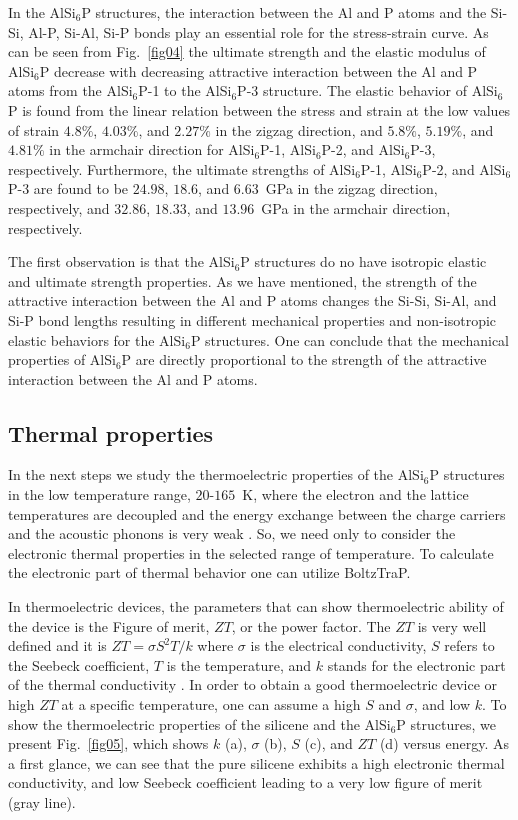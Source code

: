\documentclass[5p,twocolumn]{elsarticle}
\def\fig#1{Fig.\ \ref{#1}}
\begin{document}
In the AlSi$_6$P structures, the interaction between the Al and P atoms and the Si-Si, Al-P, Si-Al, Si-P bonds play an essential role for the stress-strain curve. As can be seen from \fig{fig04} the 
ultimate strength and the elastic modulus of AlSi$_6$P decrease with decreasing attractive interaction between the Al and P atoms from the AlSi$_6$P-1 to the AlSi$_6$P-3 structure. 
The elastic behavior of AlSi$_6$P is found from
the linear relation between the stress and strain at the low values of strain $4.8\%$, $4.03\%$, and $2.27\%$ in the zigzag direction, and $5.8\%$, $5.19\%$, and $4.81\%$ in the armchair direction for 
AlSi$_6$P-1, AlSi$_6$P-2, and AlSi$_6$P-3, respectively.
%
Furthermore, the ultimate strengths of AlSi$_6$P-1, AlSi$_6$P-2, and AlSi$_6$P-3 are found to be $24.98$, $18.6$, and $6.63$~GPa in the zigzag direction, respectively, and $32.86$, $18.33$, and $13.96$~GPa in the armchair direction, respectively. 

The first observation is that the AlSi$_6$P structures do no have isotropic elastic and ultimate strength properties. As we have mentioned, the strength of the attractive interaction between the Al and P atoms changes the Si-Si, Si-Al, and Si-P bond lengths resulting in different mechanical properties and non-isotropic elastic behaviors for the AlSi$_6$P structures. One can conclude that the mechanical properties of AlSi$_6$P are directly proportional to the strength of the attractive interaction between the Al and P atoms.



\subsection{Thermal properties}

In the next steps we study the thermoelectric properties of the AlSi$_6$P structures in the low temperature range, $20\text{-}165$~K, where the electron and the lattice temperatures are decoupled and the energy exchange between the charge carriers and the acoustic phonons is very weak \cite{PhysRevB.87.035415, ABDULLAH2021110095}. So, we need only to consider the electronic thermal properties in the selected range of temperature. To calculate the electronic part of thermal behavior one can utilize BoltzTraP.

In thermoelectric devices, the parameters that can show thermoelectric ability of the device is the Figure of merit, $ZT$, or the power factor.
The $ZT$ is very well defined and it is $ZT = \sigma S^2 T/k$ where $\sigma$ is the electrical conductivity, $S$ refers to the Seebeck coefficient, $T$ is the temperature, and $k$ stands for the electronic part of the thermal conductivity \cite{ABDULLAH2021413273}. In order to obtain a good thermoelectric device or high $ZT$ at a specific temperature, one can assume a high $S$ and $\sigma$, and low $k$. 
To show the thermoelectric properties of the silicene and the AlSi$_6$P structures, we present \fig{fig05}, which shows $k$ (a), $\sigma$ (b), $S$ (c), and $ZT$ (d) versus energy. 
As a first glance, we can see that the pure silicene exhibits a high electronic thermal conductivity, and low Seebeck coefficient leading to a very low figure of merit (gray line). 
\end{document}
